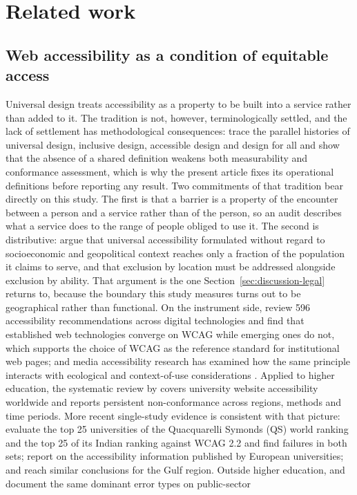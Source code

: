 \documentclass[pdflatex,sn-basic,Numbered,iicol]{sn-jnl}
\theoremstyle{thmstyleone}
\theoremstyle{thmstyletwo}
\theoremstyle{thmstylethree}
\begin{document}
	\section{Related work}\label{sec:related}
	
	\subsection{Web accessibility as a condition of equitable access}\label{sec:related-a11y}
	
	Universal design treats accessibility as a property to be built into a service rather than added to it. The tradition is not, however, terminologically settled, and the lack of settlement has methodological consequences: \citet{persson2015universal} trace the parallel histories of universal design, inclusive design, accessible design and design for all and show that the absence of a shared definition weakens both measurability and conformance assessment, which is why the present article fixes its operational definitions before reporting any result. Two commitments of that tradition bear directly on this study. The first is that a barrier is a property of the encounter between a person and a service rather than of the person, so an audit describes what a service does to the range of people obliged to use it. The second is distributive: \citet{abascal2016rethinking} argue that universal accessibility formulated without regard to socioeconomic and geopolitical context reaches only a fraction of the population it claims to serve, and that exclusion by location must be addressed alongside exclusion by ability. That argument is the one Section~\ref{sec:discussion-legal} returns to, because the boundary this study measures turns out to be geographical rather than functional. On the instrument side, \citet{etxabeantia2025characterisation} review 596 accessibility recommendations across digital technologies and find that established web technologies converge on WCAG while emerging ones do not, which supports the choice of WCAG as the reference standard for institutional web pages; and media accessibility research has examined how the same principle interacts with ecological and context-of-use considerations \citep{hermosaramirez2025universal}. Applied to higher education, the systematic review by \citet{campoverdemolina2023accessibility} covers university website accessibility worldwide and reports persistent non-conformance across regions, methods and time periods. More recent single-study evidence is consistent with that picture: \citet{krittika2025accessibility} evaluate the top 25 universities of the Quacquarelli Symonds (QS) world ranking and the top 25 of its Indian ranking against WCAG 2.2 and find failures in both sets; \citet{krejtz2025higher} report on the accessibility information published by European universities; and \citet{fakrudeen2025evaluation} reach similar conclusions for the Gulf region. Outside higher education, \citet{aljedaani2025egovernment} and \citet{iniesto2025service} document the same dominant error types on public-sector 
\end{document}
